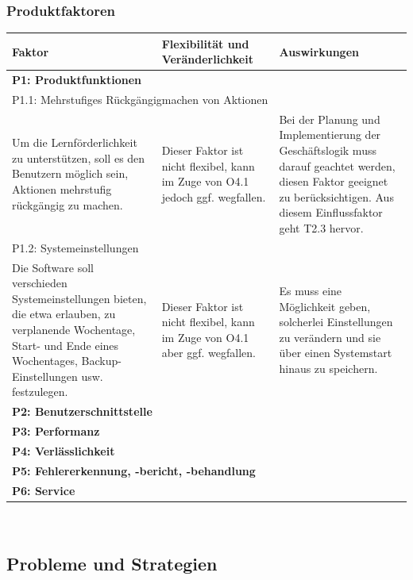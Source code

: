 \documentclass[fontsize=12pt,paper=a4,twoside]{scrartcl}
\begin{document}
\subsubsection{Produktfaktoren}
\begin{tabularx}{\textwidth}{|X|X|X|}
\hline
\textbf{Faktor} & \textbf{Flexibilität und Veränderlichkeit} & \textbf{Auswirkungen}\\\hline
\hline
\multicolumn{3}{|l|}{\textbf{P1: Produktfunktionen}}\\\hline
\multicolumn{3}{|l|}{P1.1: Mehrstufiges Rückgängigmachen von Aktionen}\\\hline
Um die Lernförderlichkeit zu unterstützen, soll es den Benutzern möglich sein, Aktionen mehrstufig rückgängig zu machen. & Dieser Faktor ist nicht flexibel, kann im Zuge von O4.1 jedoch ggf. wegfallen. & Bei der Planung und Implementierung der Geschäftslogik muss darauf geachtet werden, diesen Faktor geeignet zu berücksichtigen. Aus diesem Einflussfaktor geht T2.3 hervor.
\\\hline
\multicolumn{3}{|l|}{P1.2: Systemeinstellungen}\\\hline
Die Software soll verschieden Systemeinstellungen bieten, die etwa erlauben, zu verplanende Wochentage, Start- und Ende eines Wochentages, Backup-Einstellungen usw. festzulegen. & Dieser Faktor ist nicht flexibel, kann im Zuge von O4.1 aber ggf. wegfallen. & Es muss eine Möglichkeit geben, solcherlei Einstellungen zu verändern und sie über einen Systemstart hinaus zu speichern.\\\hline
\multicolumn{3}{|l|}{\textbf{P2: Benutzerschnittstelle}}\\\hline

\multicolumn{3}{|l|}{\textbf{P3: Performanz}}\\\hline

\multicolumn{3}{|l|}{\textbf{P4: Verlässlichkeit}}\\\hline

\multicolumn{3}{|l|}{\textbf{P5: Fehlererkennung, -bericht, -behandlung}}\\\hline

\multicolumn{3}{|l|}{\textbf{P6: Service}}\\\hline
\end{tabularx}\\


\subsection{Probleme und Strategien}
\label{sec:strategien}
\end{document}
